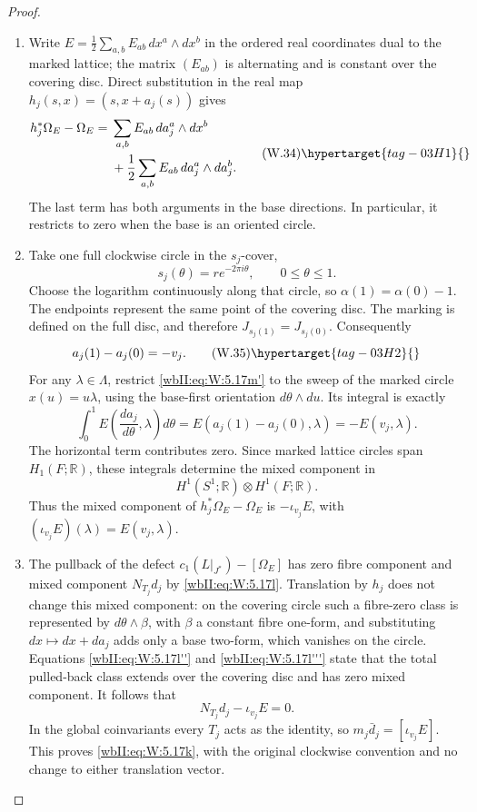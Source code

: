 \begin{proof}
\begin{enumerate}[label={$\langle1\rangle$\arabic*.},leftmargin=*]
\item Write \(E=\frac12\sum_{a,b}E_{ab}\,dx^a\wedge dx^b\) in the
ordered real coordinates dual to the marked lattice; the matrix
\((E_{ab})\) is alternating and is constant over the covering
disc.  Direct substitution in the real map
\(h_j(s,x)=(s,x+a_j(s))\) gives
\[
 \begin{split}
 h_j^*\Omega_E-\Omega_E
  ={}&\sum_{a,b}E_{ab}\,d a_j^a\wedge dx^b\\
    &+\frac12\sum_{a,b}E_{ab}\,d a_j^a\wedge d a_j^b.
 \end{split}
 \tag{W.34}\hypertarget{tag-03H1}{}\label{wbII:eq:W:5.17m'}
\]
The last term has both arguments in the base directions.
In particular, it restricts to zero when the base is an oriented
circle.

\item Take one full clockwise circle in the \(s_j\)-cover,
\[
 s_j(\theta)=r e^{-2\pi i\theta},\qquad 0\le\theta\le1.
\]
Choose the logarithm continuously along that circle, so
\(\alpha(1)=\alpha(0)-1\).  The endpoints represent the same
point of the covering disc.  The marking is defined on the full
disc, and therefore \(J_{s_j(1)}=J_{s_j(0)}\).  Consequently
\[
 a_j(1)-a_j(0)=-v_j.
 \tag{W.35}\hypertarget{tag-03H2}{}\label{wbII:eq:W:5.17m''}
\]
For any \(\lambda\in\Lambda\), restrict \eqref{wbII:eq:W:5.17m'} to the sweep of
the marked circle \(x(u)=u\lambda\), using the base-first
orientation \(d\theta\wedge du\).  Its integral is exactly
\[
 \int_0^1 E\!\left(\frac{d a_j}{d\theta},\lambda\right)d\theta
 =E(a_j(1)-a_j(0),\lambda)
 =-E(v_j,\lambda).
\]
The horizontal term contributes zero.  Since marked lattice
circles span \(H_1(F;\mathbb R)\), these integrals determine the
mixed component in
\[
 H^1(S^1;\mathbb R)\otimes H^1(F;\mathbb R).
\]
Thus the mixed component of \(h_j^*\Omega_E-\Omega_E\) is
\(-\iota_{v_j}E\), with \((\iota_{v_j}E)(\lambda)=E(v_j,\lambda)\).

\item The pullback of the defect
\(c_1(L|_{J^*})-[\Omega_E]\) has zero fibre component and mixed
component \(N_{T_j}d_j\) by \eqref{wbII:eq:W:5.17l}.  Translation by \(h_j\) does
not change this mixed component: on the covering circle such
a fibre-zero class is represented by
\(d\theta\wedge\beta\), with \(\beta\) a constant fibre one-form,
and substituting \(dx\mapsto dx+d a_j\) adds only a base two-form,
which vanishes on the circle.  Equations \eqref{wbII:eq:W:5.17l''} and
\eqref{wbII:eq:W:5.17l'''} state that the total pulled-back class extends over
the covering disc and has zero mixed component.  It follows that
\[
 N_{T_j}d_j-\iota_{v_j}E=0.
\]
In the global coinvariants every \(T_j\) acts as the identity,
so \(m_j\bar d_j=[\iota_{v_j}E]\).  This proves \eqref{wbII:eq:W:5.17k}, with the
original clockwise convention and no change to either translation
vector.

\end{enumerate}
\end{proof}
